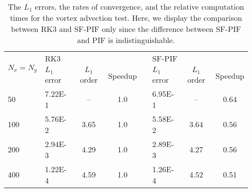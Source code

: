 \documentclass[times,preprint,3p]{elsarticle}
\begin{document}
\begin{table}[hb!]
    \centering
    \caption{The \( L_{1} \) errors, the rates of convergence,
    and the relative computation times for the vortex advection test.
    Here, we display the comparison between RK3 and SF-PIF only
    since the difference between SF-PIF and PIF is indistinguishable.
    }\label{table:vortex}
    \begin{tabular}{@{}llccllcc@{}}
%
        \toprule
        \multirow{2}{*}{\( N_{x} = N_{y} \)} & RK3 &  &  &  & \multicolumn{3}{l}{SF-PIF} \\
        \cmidrule(lr){2-4} \cmidrule(l){6-8}
        &   \(L_{1}\) error & \(L_{1}\) order   & Speedup &  & \(L_{1}\) error & \(L_{1}\) order & Speedup \\ \midrule
         50  & \num{7.22E-1} & \---              & 1.0 &  & \num{6.95E-1}   & \---              & 0.64 \\
        100 & \num{5.76E-2} & 3.65            & 1.0 &  & \num{5.58E-2}   & 3.64            & 0.56 \\
        200 & \num{2.94E-3} & 4.29            & 1.0 &  & \num{2.89E-3}   & 4.27            & 0.56 \\
        400 & \num{1.22E-4} & 4.59            & 1.0 &  & \num{1.26E-4}   & 4.52            & 0.51
    \end{tabular}
\end{table}
\end{document}
